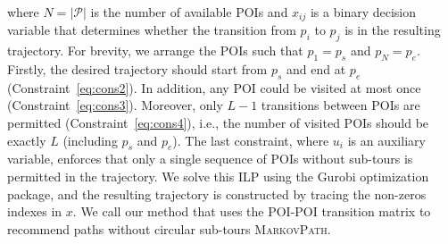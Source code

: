 where $N=|\mathcal{P}|$ is the number of available POIs and $x_{ij}$ is a binary decision variable
that determines whether the transition from $p_i$ to $p_j$ %
is in the resulting trajectory.
For brevity, we arrange the POIs such that $p_1 = p_s$ and $p_N = p_e$.
Firstly, the desired trajectory should start from $p_s$ and end at $p_e$ (Constraint~\ref{eq:cons2}).
In addition, any POI could be visited at most once (Constraint~\ref{eq:cons3}).
Moreover, only $L-1$ transitions between POIs are permitted (Constraint~\ref{eq:cons4}),
i.e., the number of visited POIs should be exactly $L$ (including $p_s$ and $p_e$).
The last constraint, where $u_i$ is an auxiliary variable,
enforces that only a single sequence of POIs without sub-tours is permitted in the trajectory.
We solve this ILP using the Gurobi optimization package, and the resulting trajectory is constructed by tracing the non-zeros indexes in $x$. 
We call our method that uses the POI-POI transition matrix to recommend paths
without circular sub-tours \textsc{MarkovPath}.


